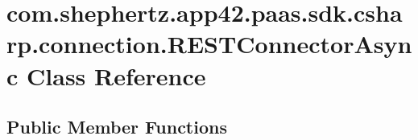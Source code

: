 \hypertarget{classcom_1_1shephertz_1_1app42_1_1paas_1_1sdk_1_1csharp_1_1connection_1_1_r_e_s_t_connector_async}{\section{com.\+shephertz.\+app42.\+paas.\+sdk.\+csharp.\+connection.\+R\+E\+S\+T\+Connector\+Async Class Reference}
\label{classcom_1_1shephertz_1_1app42_1_1paas_1_1sdk_1_1csharp_1_1connection_1_1_r_e_s_t_connector_async}
}
\subsection*{Public Member Functions}
